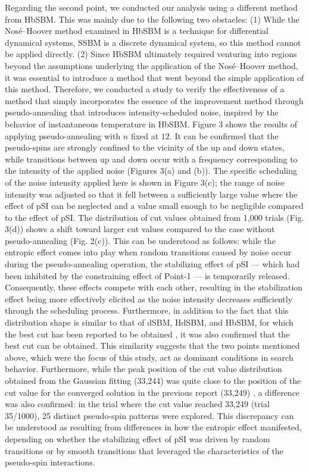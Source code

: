 \documentclass[%
 reprint,
 amsmath,amssymb,
 aps,
]{revtex4-2}
\begin{document}
Regarding the second point, we conducted our analysis using a different method from HbSBM. This was mainly due to the following two obstacles: (1) While the Nosé–Hoover method examined in HbSBM is a technique for differential dynamical systems, SSBM is a discrete dynamical system, so this method cannot be applied directly. (2) Since HbSBM ultimately required venturing into regions beyond the assumptions underlying the application of the Nosé–Hoover method, it was essential to introduce a method that went beyond the simple application of this method. Therefore, we conducted a study to verify the effectiveness of a method that simply incorporates the essence of the improvement method through pseudo-annealing that introduces intensity-scheduled noise, inspired by the behavior of instantaneous temperature in HbSBM\cite{GOTO-02}. Figure 3 shows the results of applying pseudo-annealing with $n$ fixed at $12$. It can be confirmed that the pseudo-spins are strongly confined to the vicinity of the up and down states, while transitions between up and down occur with a frequency corresponding to the intensity of the applied noise (Figures 3(a) and (b)). The specific scheduling of the noise intensity applied here is shown in Figure 3(c); the range of noise intensity was adjusted so that it fell between a sufficiently large value where the effect of pSI can be neglected and a value small enough to be negligible compared to the effect of pSI. The distribution of cut values obtained from 1,000 trials (Fig. 3(d)) shows a shift toward larger cut values compared to the case without pseudo-annealing (Fig. 2(c)). This can be understood as follows: while the entropic effect comes into play when random transitions caused by noise occur during the pseudo-annealing operation, the stabilizing effect of pSI — which had been inhibited by the constraining effect of Point-1 — is temporarily released. Consequently, these effects compete with each other, resulting in the stabilization effect being more effectively elicited as the noise intensity decreases sufficiently through the scheduling process. Furthermore, in addition to the fact that this distribution shape is similar to that of dSBM, HdSBM, and HbSBM, for which the best cut has been reported to be obtained \cite{GOTO-02}, it was also confirmed that the best cut can be obtained. This similarity suggests that the two points mentioned above, which were the focus of this study, act as dominant conditions in search behavior. Furthermore, while the peak position of the cut value distribution obtained from the Gaussian fitting (33,244) was quite close to the position of the cut value for the converged solution in the previous report (33,249) \cite{Toshiy02}, a difference was also confirmed: in the trial where the cut value reached 33,249 (trial 35/1000), 25 distinct pseudo-spin patterns were explored. This discrepancy can be understood as resulting from differences in how the entropic effect manifested, depending on whether the stabilizing effect of pSI was driven by random transitions or by smooth transitions that leveraged the characteristics of the pseudo-spin interactions.
\end{document}
